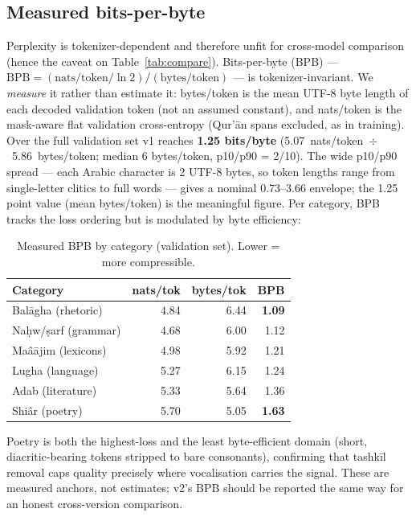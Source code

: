 \documentclass[10pt,twocolumn]{article}
\begin{document}
\subsection{Measured bits-per-byte}
\label{sec:bpb}
Perplexity is tokenizer-dependent and therefore unfit for cross-model comparison
(hence the caveat on Table~\ref{tab:compare}). Bits-per-byte (BPB) ---
$\text{BPB}=(\text{nats/token}/\ln 2)/(\text{bytes/token})$ --- is tokenizer-invariant.
We \emph{measure} it rather than estimate it: bytes/token is the mean UTF-8 byte length
of each decoded validation token (not an assumed constant), and nats/token is the
mask-aware flat validation cross-entropy (Qur'\=an spans excluded, as in training).
Over the full validation set v1 reaches \textbf{1.25 bits/byte}
(5.07~nats/token~$\div$~5.86~bytes/token; median 6 bytes/token, p10/p90 = 2/10).
The wide p10/p90 spread --- each Arabic character is 2 UTF-8 bytes, so token lengths
range from single-letter clitics to full words --- gives a nominal 0.73--3.66 envelope;
the 1.25 point value (mean bytes/token) is the meaningful figure. Per category, BPB
tracks the loss ordering but is modulated by byte efficiency:

\begin{table}[h]
\centering\small
\caption{Measured BPB by category (validation set). Lower = more compressible.}
\label{tab:bpb}
\begin{tabular}{@{}lrrr@{}}
\toprule
Category & nats/tok & bytes/tok & BPB \\
\midrule
Bal\=agha (rhetoric)        & 4.84 & 6.44 & \textbf{1.09} \\
Na\d{h}w/\d{s}arf (grammar) & 4.68 & 6.00 & 1.12 \\
Ma\^{a}\=ajim (lexicons)    & 4.98 & 5.92 & 1.21 \\
Lugha (language)            & 5.27 & 6.15 & 1.24 \\
Adab (literature)           & 5.33 & 5.64 & 1.36 \\
Shi\^{a}r (poetry)          & 5.70 & 5.05 & \textbf{1.63} \\
\bottomrule
\end{tabular}
\end{table}

\noindent Poetry is both the highest-loss and the least byte-efficient domain (short,
diacritic-bearing tokens stripped to bare consonants), confirming that tashk\=il removal
caps quality precisely where vocalisation carries the signal. These are measured
anchors, not estimates; v2's BPB should be reported the same way for an honest
cross-version comparison.
\end{document}
